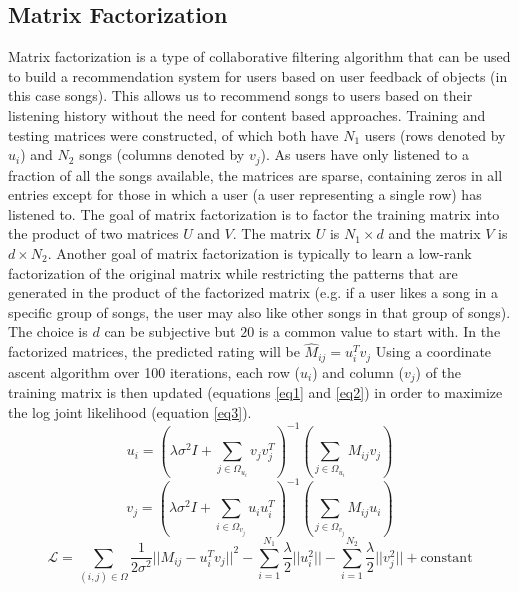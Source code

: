 \documentclass[12pt,preprint]{aastex}
\newcommand{\TRANSPOSE}{\ensuremath{T}}
\begin{document}
\subsection{Matrix Factorization}
Matrix factorization is a type of collaborative filtering algorithm that can be used to build a recommendation system for users based on user feedback of objects (in this case songs). This allows us to recommend songs to users based on their listening history without the need for content based approaches. 
Training and testing matrices were constructed, of which both have $N_1$ users (rows denoted by $u_i$) and $N_2$ songs (columns denoted by $v_j$). As users have only listened to a fraction of all the songs available, the matrices are sparse, containing zeros in all entries except for those in which a user (a user representing a single row) has listened to. The goal of matrix factorization is to factor the training matrix into the product of two matrices $U$ and $V$.  The matrix $U$ is $N_1 \times d$ and the matrix $V$ is $d \times N_2$. Another goal of matrix factorization is typically to learn a low-rank factorization of the original matrix while restricting the patterns that are generated in the product of the factorized matrix (e.g. if a user likes a song in a specific group of songs, the user may also like other songs in that group of songs). The choice is $d$ can be subjective but $20$ is a common value to start with. In the factorized matrices, the predicted rating will be $\hat{M}_{ij} = u_i^\TRANSPOSE  v_j$
Using a coordinate ascent algorithm over 100 iterations, each row ($u_i$) and column ($v_j$) of the training matrix is then updated (equations \ref{eq1} and \ref{eq2}) in order to maximize the log joint likelihood (equation \ref{eq3}).
\begin{equation}
u_i = \left( \lambda\sigma^2 I + \sum_{j \in \Omega_{u_i}} v_j v_j^\TRANSPOSE \right)^{-1}\left(\sum_{j \in \Omega_{u_i}} M_{ij} v_{j} \right)
\label{eq1}
\end{equation}
\begin{equation}
v_j = \left( \lambda\sigma^2 I + \sum_{i \in \Omega_{v_j}} u_i u_i^\TRANSPOSE  \right)^{-1}\left(\sum_{j \in \Omega_{v_j}} M_{ij} u_{i} \right)
\label{eq2}
\end{equation}
\begin{equation}
\mathcal{L} = \sum_{(i,j) \in \Omega} \frac{1}{2\sigma^2} {|| M_{ij} - u_i^\TRANSPOSE  v_j||}^2 - \sum_{i=1}^{N_1} \frac{\lambda}{2} ||u_i^2 || - \sum_{i=1}^{N_2} \frac{\lambda}{2} ||v_j^2 || + \text{constant}
\label{eq3} 
\end{equation}
\end{document}
